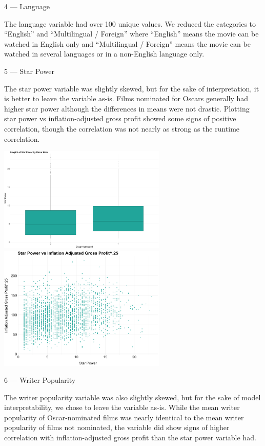 \documentclass[10pt]{article}
\begin{document}
4 --- Language

The language variable had over 100 unique values. We reduced the categories to “English” and “Multilingual / Foreign” where “English” means the movie can be watched in English only and “Multilingual / Foreign” means the movie can be watched in several languages or in a non-English language only.



5 --- Star Power

The star power variable was slightly skewed, but for the sake of interpretation, it is better to leave the variable as-is. Films nominated for Oscars generally had higher star power although the differences in means were not drastic. Plotting star power vs inflation-adjusted gross profit showed some signs of positive correlation, though the correlation was not nearly as strong as the runtime correlation.

\begin{center}
\includegraphics[width=8cm]{_assets/_eda/star_power_on.png}
\hspace{1cm}
\includegraphics[width=8cm]{_assets/_eda/star_power_iagp.png}
\end{center}

6 --- Writer Popularity

The writer popularity variable was also slightly skewed, but for the sake of model interpretability, we chose to leave the variable as-is. While the mean writer popularity of Oscar-nominated films was nearly identical to the mean writer popularity of films not nominated, the variable did show signs of higher correlation with inflation-adjusted gross profit than the star power variable had. 
\end{document}
